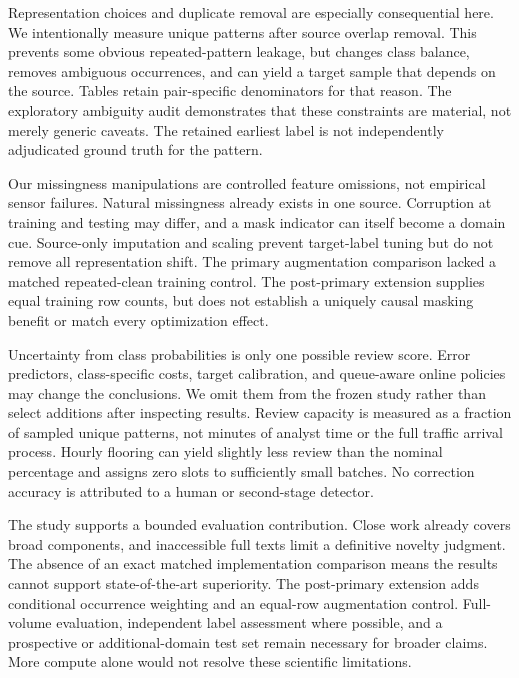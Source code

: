 \documentclass[manuscript,screen,nonacm]{acmart}
\begin{document}
Representation choices and duplicate removal are especially consequential here. We intentionally measure unique patterns after source overlap removal. This prevents some obvious repeated-pattern leakage, but changes class balance, removes ambiguous occurrences, and can yield a target sample that depends on the source. Tables retain pair-specific denominators for that reason. The exploratory ambiguity audit demonstrates that these constraints are material, not merely generic caveats. The retained earliest label is not independently adjudicated ground truth for the pattern.

Our missingness manipulations are controlled feature omissions, not empirical sensor failures. Natural missingness already exists in one source. Corruption at training and testing may differ, and a mask indicator can itself become a domain cue. Source-only imputation and scaling prevent target-label tuning but do not remove all representation shift. The primary augmentation comparison lacked a matched repeated-clean training control. The post-primary extension supplies equal training row counts, but does not establish a uniquely causal masking benefit or match every optimization effect.

Uncertainty from class probabilities is only one possible review score. Error predictors, class-specific costs, target calibration, and queue-aware online policies may change the conclusions. We omit them from the frozen study rather than select additions after inspecting results. Review capacity is measured as a fraction of sampled unique patterns, not minutes of analyst time or the full traffic arrival process. Hourly flooring can yield slightly less review than the nominal percentage and assigns zero slots to sufficiently small batches. No correction accuracy is attributed to a human or second-stage detector.

The study supports a bounded evaluation contribution. Close work already covers broad components, and inaccessible full texts limit a definitive novelty judgment. The absence of an exact matched implementation comparison means the results cannot support state-of-the-art superiority. The post-primary extension adds conditional occurrence weighting and an equal-row augmentation control. Full-volume evaluation, independent label assessment where possible, and a prospective or additional-domain test set remain necessary for broader claims. More compute alone would not resolve these scientific limitations.
\end{document}
